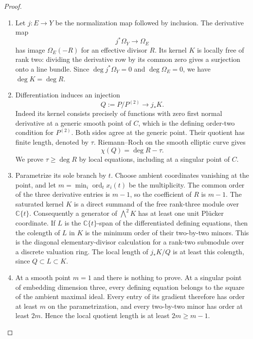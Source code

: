 \begin{proof}

\begin{enumerate}[label={$\langle1\rangle$\arabic*.},leftmargin=*]
\item Let $j:E\to Y$ be the normalization map followed by inclusion.
The derivative map
\[
 j^*\Omega_Y\longrightarrow\Omega_E
\]
has image $\Omega_E(-R)$ for an effective divisor $R$.
Its kernel $K$ is locally free of rank two: dividing the derivative
row by its common zero gives a surjection onto a line bundle.
Since $\deg j^*\Omega_Y=0$ and $\deg\Omega_E=0$, we have
$\deg K=\deg R$.

\item Differentiation induces an injection
\[
 Q:=P/P^{(2)}\longrightarrow j_*K.
\]
Indeed its kernel consists precisely of functions with zero first
normal derivative at a generic smooth point of $C$, which is the
defining order-two condition for $P^{(2)}$. Both sides agree at the
generic point. Their quotient has finite length, denoted by $\tau$.
Riemann--Roch on the smooth elliptic curve gives
\[
 \chi(Q)=\deg R-\tau.
\]
We prove $\tau\ge\deg R$ by local equations, including at a
singular point of $C$.

\item Parametrize its sole branch by $t$. Choose ambient coordinates
vanishing at the point, and let
$m=\min_i\operatorname{ord}_t x_i(t)$ be the multiplicity.
The common order of the three derivative entries is $m-1$,
so the coefficient of $R$ is $m-1$. The saturated kernel $K$
is a direct summand of the free rank-three module over
$\mathbb C\{t\}$. Consequently a generator of $\bigwedge^2K$
has at least one unit Pl\"ucker coordinate. If $L$ is the
$\mathbb C\{t\}$-span of the differentiated defining equations,
then the colength of $L$ in $K$ is the minimum order of their
two-by-two minors. This is the diagonal elementary-divisor
calculation for a rank-two submodule over a discrete valuation
ring. The local length of $j_*K/Q$ is at least this colength,
since $Q\subset L\subset K$.

\item At a smooth point $m=1$ and there is nothing to prove.
At a singular point of embedding dimension three, every defining
equation belongs to the square of the ambient maximal ideal.
Every entry of its gradient therefore has order at least $m$
on the parametrization, and every two-by-two minor has order
at least $2m$. Hence the local quotient length is at least
$2m\ge m-1$.


\end{enumerate}
\end{proof}
